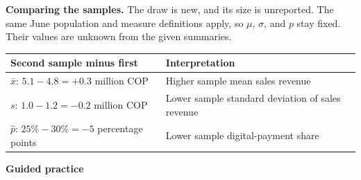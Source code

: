 \smallskip
\textbf{Comparing the samples.}
The draw is new, and its size is unreported. The same June population and
measure definitions apply, so $\mu$, $\sigma$, and $p$ stay fixed. Their values
are unknown from the given summaries.

\begin{tabularx}{\linewidth}{|L|L|}
    \hline
    \textbf{Second sample minus first} & \textbf{Interpretation} \\ \hline
    $\bar{x}$: $5.1-4.8=+0.3$ million COP & Higher sample mean sales revenue \\ \hline
    $s$: $1.0-1.2=-0.2$ million COP & Lower sample standard deviation of sales revenue \\ \hline
    $\hat p$: $25\%-30\%=-5$ percentage points & Lower sample digital-payment share \\ \hline
\end{tabularx}

\clearpage	
\begin{center}
	\vspace{-3mm}
	\textbf{Guided practice}
	\vspace{-9mm}
\end{center}




